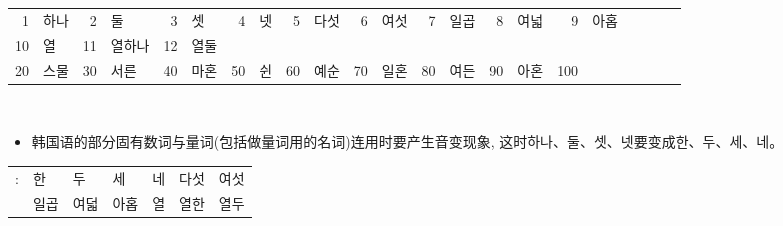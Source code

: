 \section{\kr {}}
\begin{grammar}
	\begin{grammarsect}[韩国语的固有数词\\]
		\begin{tabular}{rlrlrlrlrlrlrlrlrlrlrl}
			1  & 하나 & 2  & 둘   & 3  & 셋  & 4  & 넷 & 5  & 다섯 & 6  & 여섯 & 7  & 일곱 & 8  & 여넓 & 9   & 아홉          \\
			10 & 열  & 11 & 열하나 & 12 & 열둘                                                                      \\
			20 & 스물 & 30 & 서른  & 40 & 마혼 & 50 & 쉰 & 60 & 예순 & 70 & 일혼 & 80 & 여든 & 90 & 아혼 & 100 & \kr \ruby{百}{백}
		\end{tabular}\\
		\begin{itemize}
			\item 韩国语的部分固有数词与量词(包括做量词用的名词)连用时要产生音变现象, 这时하나、둘、셋、넷要变成한、두、세、네。
		\end{itemize}
		\begin{tabular}{lllllll}
			\kr \ruby{例}{예}: &\kr  한 \ruby{時}{시}  & \kr 두 \ruby{時}{시}  & \kr 세 \ruby{時}{시}  & \kr 네 \ruby{時}{시} & \kr 다섯 \ruby{時}{시} & \kr 여섯 \ruby{時}{시} \\
			             & \kr 일곱 \ruby{時}{시} & \kr 여덟 \ruby{時}{시} & \kr 아홉 \ruby{時}{시} & \kr 열 \ruby{時}{시} & \kr 열한 \ruby{時}{시} & \kr 열두 \ruby{時}{시} \\
		\end{tabular}\\
	\end{grammarsect}
\end{grammar}
